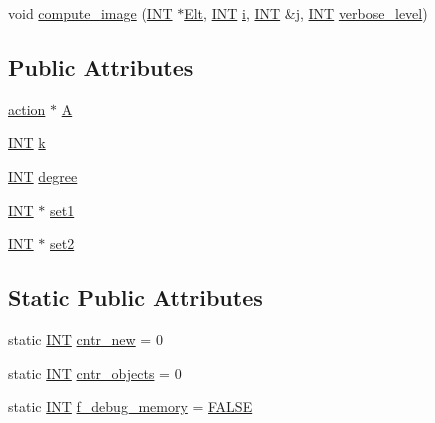 \begin{DoxyCompactItemize}
\item 
void \mbox{\hyperlink{classaction__on__k__subsets_ac29797ac5bdc7845956370d76d4839b7}{compute\+\_\+image}} (\mbox{\hyperlink{galois_8h_a09fddde158a3a20bd2dcadb609de11dc}{I\+NT}} $\ast$\mbox{\hyperlink{simeon_8_c_aec1406935bdb1fee3561fcb840964100}{Elt}}, \mbox{\hyperlink{galois_8h_a09fddde158a3a20bd2dcadb609de11dc}{I\+NT}} \mbox{\hyperlink{alphabet2_8_c_acb559820d9ca11295b4500f179ef6392}{i}}, \mbox{\hyperlink{galois_8h_a09fddde158a3a20bd2dcadb609de11dc}{I\+NT}} \&\mbox{\hyperlink{alphabet2_8_c_a37d972ae0b47b9099e30983131d31916}{j}}, \mbox{\hyperlink{galois_8h_a09fddde158a3a20bd2dcadb609de11dc}{I\+NT}} \mbox{\hyperlink{simeon_8_c_a818073fbcc2f439e7c56952f67386122}{verbose\+\_\+level}})
\end{DoxyCompactItemize}
\subsection*{Public Attributes}
\begin{DoxyCompactItemize}
\item 
\mbox{\hyperlink{classaction}{action}} $\ast$ \mbox{\hyperlink{classaction__on__k__subsets_a2fe6d509c85e0076f7729c4e22e9f50b}{A}}
\item 
\mbox{\hyperlink{galois_8h_a09fddde158a3a20bd2dcadb609de11dc}{I\+NT}} \mbox{\hyperlink{classaction__on__k__subsets_af03f2c37ce7e6084da384d9785794e67}{k}}
\item 
\mbox{\hyperlink{galois_8h_a09fddde158a3a20bd2dcadb609de11dc}{I\+NT}} \mbox{\hyperlink{classaction__on__k__subsets_a5362d311f43b205807d51607751e6125}{degree}}
\item 
\mbox{\hyperlink{galois_8h_a09fddde158a3a20bd2dcadb609de11dc}{I\+NT}} $\ast$ \mbox{\hyperlink{classaction__on__k__subsets_a432abf72a8565f7dc6640bd6f3a837d3}{set1}}
\item 
\mbox{\hyperlink{galois_8h_a09fddde158a3a20bd2dcadb609de11dc}{I\+NT}} $\ast$ \mbox{\hyperlink{classaction__on__k__subsets_a4f0ca560067f182834c2e5a798de243c}{set2}}
\end{DoxyCompactItemize}
\subsection*{Static Public Attributes}
\begin{DoxyCompactItemize}
\item 
static \mbox{\hyperlink{galois_8h_a09fddde158a3a20bd2dcadb609de11dc}{I\+NT}} \mbox{\hyperlink{classaction__on__k__subsets_ac03611283b51fecaf48b971a4d0f7179}{cntr\+\_\+new}} = 0
\item 
static \mbox{\hyperlink{galois_8h_a09fddde158a3a20bd2dcadb609de11dc}{I\+NT}} \mbox{\hyperlink{classaction__on__k__subsets_a94688c5374bf369e3d80e5abff6a8e1b}{cntr\+\_\+objects}} = 0
\item 
static \mbox{\hyperlink{galois_8h_a09fddde158a3a20bd2dcadb609de11dc}{I\+NT}} \mbox{\hyperlink{classaction__on__k__subsets_a31c7f0f8c114a5e5b096689f42853384}{f\+\_\+debug\+\_\+memory}} = \mbox{\hyperlink{nauty_8h_aa93f0eb578d23995850d61f7d61c55c1}{F\+A\+L\+SE}}
\end{DoxyCompactItemize}


